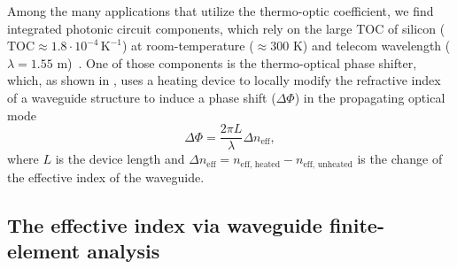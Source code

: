 Among the many applications that utilize the thermo-optic coefficient, we find integrated photonic circuit components, which rely on the large 
TOC of silicon ($\text{TOC} \approx 1.8 \cdot 10^{-4}\, \text{K}^{-1}$) at room-temperature ($\approx300$ K) and telecom wavelength 
($\lambda=1.55$ \textmu m)~\cite{thermo-optic-coef}. One of those components is the thermo-optical phase shifter, which, as shown in ,
uses a heating device to locally modify the refractive index of a waveguide structure to induce a phase shift ($\Delta \Phi$) in the propagating optical mode
\begin{equation*}
\Delta \Phi = \frac{2\pi L}{\lambda} \Delta n_\text{eff},
\end{equation*}
where $L$ is the device length and $\Delta n_\text{eff} = n_\text{eff, heated} - n_\text{eff, unheated}$ is the change of the effective index of the waveguide. 

\subsection*{The effective index via waveguide finite-element analysis}

